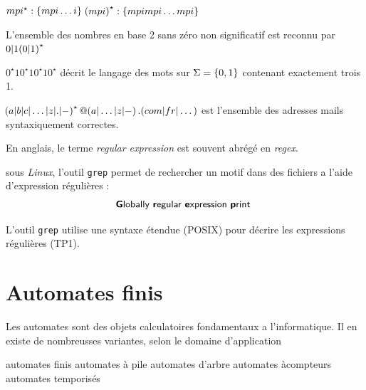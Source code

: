 \documentclass[a4paper,french,bookmarks]{book}
\begin{document}
    \begin{example}{}{}
        \begin{enumerate}
            \itt $mpi^\star : \left\{mpi \dots i\right\}$
            \itt $\!\left(mpi\right)^\star : \left\{mpimpi \dots mpi\right\}$
            
            \itt L'ensemble des nombres en base 2 sans zéro non significatif est reconnu par
            $0 \vert 1 \!\left(0 \vert 1\right)^\star$
            
            \itt $0^\star 1 0^\star 1 0^\star 1 0^\star$ décrit le langage des mots sur $\Sigma = \left\{0, 1\right\}$ contenant exactement trois 1.
        
            \itt $\!\left(a \vert b \vert c \vert \dots \vert z \vert .\vert-\right)^\star @ \!\left(a \vert \dots \vert z \vert -\right).\!\left(com \vert fr \vert \dots\right)$
            est l'ensemble des adresses mails syntaxiquement correctes.
        \end{enumerate}
    \end{example}
    
    \begin{enumerate}
        \itt En anglais, le terme \textit{regular expression} est souvent abrégé en \textit{regex}.
        
        \itt sous \textit{Linux}, l'outil \texttt{grep} permet de rechercher un motif dans des fichiers a l'aide d'expression régulières :
        \[ \text{\sffamily\textbf Globally \textbf regular \textbf expression \textbf print }\]
        
        L'outil \texttt{grep} utilise une syntaxe étendue (\textsf{POSIX}) pour décrire les expressions régulières (\cf TP1).
        
    \end{enumerate}
    
    \section{Automates finis}
    
    Les automates sont des objets calculatoires fondamentaux a l'informatique.
    Il en existe de nombreusses variantes, selon le domaine d'application 
    \begin{enumerate}
        
        \itt automates finis 
        \itt automates à pile 
        \itt automates d'arbre 
        \itt automates àcompteurs 
        \itt automates temporisés 
        
    \end{enumerate}
    
\end{document}
